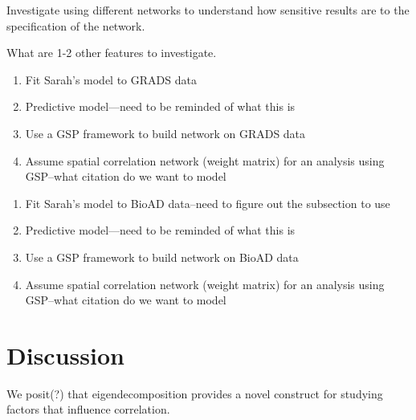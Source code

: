 \documentclass[12pt]{article}
\begin{document}
Investigate using different networks to understand how sensitive results are to the specification of the network.

What are 1-2 other features to investigate.

\begin{enumerate}
	\item{Fit Sarah's model to GRADS data}
	\item{Predictive model---need to be reminded of what this is}
	\item{Use a GSP framework to build network on GRADS data}
	\item{Assume spatial correlation network (weight matrix) for an analysis using GSP--what citation do we want to model}
\end{enumerate}

\begin{enumerate}
	\item{Fit Sarah's model to BioAD data--need to figure out the subsection to use}
	\item{Predictive model---need to be reminded of what this is}
	\item{Use a GSP framework to build network on BioAD data}
	\item{Assume spatial correlation network (weight matrix) for an analysis using GSP--what citation do we want to model}
\end{enumerate}

\section{Discussion}
We posit(?) that eigendecomposition provides a novel construct for studying factors that influence correlation.
\end{document}
